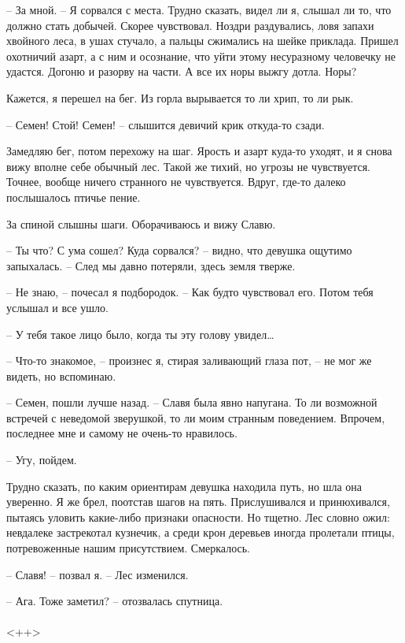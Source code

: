 \documentclass[a4paper]{book}
\begin{document}
-- За мной. -- Я сорвался с места. Трудно сказать, видел ли я, слышал ли то, что должно стать добычей. Скорее чувствовал. Ноздри раздувались, ловя запахи хвойного леса, в ушах стучало, а пальцы сжимались на шейке приклада. Пришел охотничий азарт, а с ним и осознание, что уйти этому несуразному человечку не удастся. Догоню и разорву на части. А все их норы выжгу дотла. Норы?

Кажется, я перешел на бег. Из горла вырывается то ли хрип, то ли рык. 

-- Семен! Стой! Семен! -- слышится девичий крик откуда-то сзади. 

Замедляю бег, потом перехожу на шаг. Ярость и азарт куда-то уходят, и я снова вижу  вполне себе обычный лес. Такой же тихий, но угрозы не чувствуется. Точнее, вообще ничего странного не чувствуется. Вдруг, где-то далеко послышалось птичье пение.

За спиной слышны шаги. Оборачиваюсь и вижу Славю.

-- Ты что? С ума сошел? Куда сорвался? -- видно, что девушка ощутимо запыхалась. -- След мы давно потеряли, здесь земля тверже.

-- Не знаю, -- почесал я подбородок. -- Как будто чувствовал его. Потом тебя услышал и все ушло.

-- У тебя такое лицо было, когда ты эту голову увидел\ldots

-- Что-то знакомое, -- произнес я, стирая заливающий глаза пот, -- не мог же видеть, но вспоминаю. 

-- Семен, пошли лучше назад. -- Славя была явно напугана. То ли возможной встречей с неведомой зверушкой, то ли моим странным поведением. Впрочем, последнее мне и самому не очень-то нравилось.

-- Угу, пойдем.

Трудно сказать, по каким ориентирам девушка находила путь, но шла она уверенно. Я же брел, поотстав шагов на пять. Прислушивался и принюхивался, пытаясь уловить какие-либо признаки опасности. Но тщетно. Лес словно ожил: невдалеке застрекотал кузнечик, а среди крон деревьев иногда пролетали птицы, потревоженные нашим присутствием. Смеркалось.

-- Славя! -- позвал я. -- Лес изменился.

-- Ага. Тоже заметил? -- отозвалась спутница.

\paragraph{}<++>
\end{document}
